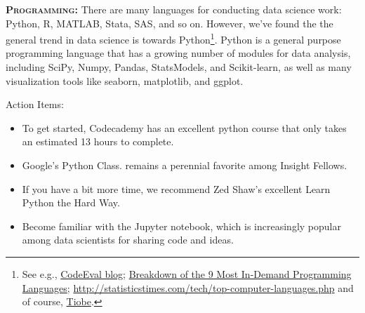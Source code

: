 \documentclass[11pt,a4paper]{article}
\begin{document}
\smallskip
\smallskip
\noindent
\textbf{\textsc{Programming:}}
There are many languages for conducting data science work: Python, R,
MATLAB, Stata, SAS, and so on. However, we've found the the general
trend in data science is towards Python\footnote{See e.g.,
\href{http://blog.codeeval.com/codeevalblog/2015\#.V5qxlpMrKRs}{CodeEval blog};
\href{http://www.codingdojo.com/blog/9-most-in-demand-programming-languages-of-2016/}{Breakdown
of the 9 Most In-Demand Programming Languages}; 
\href{http://statisticstimes.com/tech/top-computer-languages.php}{http://statisticstimes.com/tech/top-computer-languages.php} and of course, 
\href{http://www.tiobe.com/tiobe_index}{Tiobe}.}.
Python is a general purpose programming language that has a growing
number of modules for data analysis, including SciPy, Numpy, Pandas,
StatsModels, and Scikit-learn, as well as many visualization tools
like seaborn, matplotlib, and ggplot.

\smallskip
\smallskip
\noindent
Action Items:
\begin{itemize}
\item{To get started, Codecademy has an excellent python course that only
takes an estimated 13 hours to complete.}  
\item{Google's Python Class. remains a perennial favorite among Insight Fellows.}
\item{If you have a bit more time, we recommend Zed Shaw's excellent Learn Python the Hard Way.}
\item{Become familiar with the Jupyter notebook, which is increasingly popular among data scientists for sharing code and ideas.}
\end{itemize}
\end{document}
